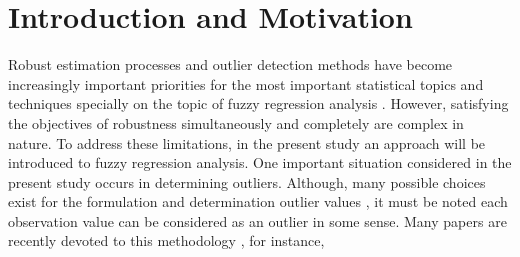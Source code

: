 \documentclass{IJFS}
\begin{document}
\section{Introduction and Motivation}
{R}{obust}
estimation processes and outlier detection methods have become increasingly important priorities for the most important statistical topics and techniques specially on the topic of fuzzy regression analysis \cite{Dur11,Are19,Cha19}.
However, satisfying the objectives of robustness simultaneously and completely are  complex in nature.
To address these limitations, in the present study an approach will be introduced to fuzzy regression analysis.
One important situation considered in the present study  occurs in determining outliers.
Although, many possible choices exist for the formulation and determination outlier values \cite{Dur11,Cha19,Cha21c}, it must be noted  each observation value can be considered as an outlier in some sense.
Many papers are recently  devoted to this methodology \cite{Chu19}, for instance,
\end{document}
